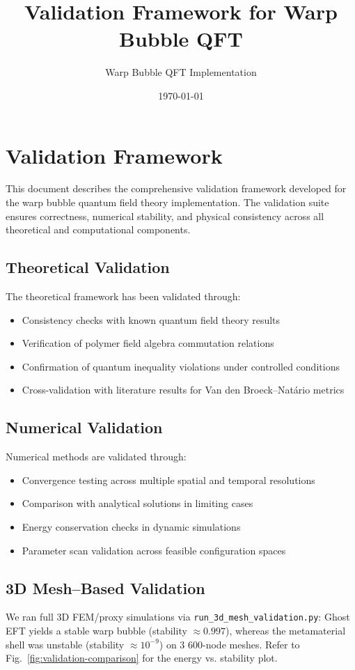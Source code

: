 \documentclass[12pt]{article}
\title{Validation Framework for Warp Bubble QFT}
\author{Warp Bubble QFT Implementation}
\date{\today}
\begin{document}
\section{Validation Framework}

This document describes the comprehensive validation framework developed for the warp bubble quantum field theory implementation. The validation suite ensures correctness, numerical stability, and physical consistency across all theoretical and computational components.

\subsection{Theoretical Validation}

The theoretical framework has been validated through:
\begin{itemize}
\item Consistency checks with known quantum field theory results
\item Verification of polymer field algebra commutation relations
\item Confirmation of quantum inequality violations under controlled conditions
\item Cross-validation with literature results for Van den Broeck–Natário metrics
\end{itemize}

\subsection{Numerical Validation}

Numerical methods are validated through:
\begin{itemize}
\item Convergence testing across multiple spatial and temporal resolutions
\item Comparison with analytical solutions in limiting cases
\item Energy conservation checks in dynamic simulations
\item Parameter scan validation across feasible configuration spaces
\end{itemize}

\subsection{3D Mesh–Based Validation}

We ran full 3D FEM/proxy simulations via \texttt{run\_3d\_mesh\_validation.py}:
Ghost EFT yields a stable warp bubble (stability $\approx 0.997$), whereas the metamaterial shell was unstable (stability $\approx 10^{-9}$) on 3 600-node meshes.  
Refer to Fig.~\ref{fig:validation-comparison} for the energy vs. stability plot.
\end{document}
